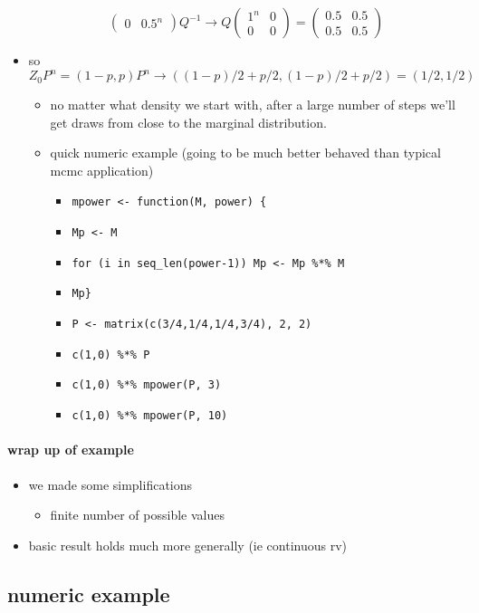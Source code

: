 \begin{itemize}
\[\begin{pmatrix}
    0 & 0.5^n \end{pmatrix} Q^{-1} \to Q \begin{pmatrix} 1^n & 0 \\ 0 &
    0 \end{pmatrix} = \begin{pmatrix} 0.5 & 0.5 \\ 0.5 &
    0.5 \end{pmatrix}\]
\item so $Z_0 P^n = (1-p, p) P^n \to ((1-p)/2 + p/2, (1-p)/2 + p/2) =
  (1/2, 1/2)$
\begin{itemize}
\item no matter what density we start with, after a large number
          of steps we'll get draws from close to the marginal
          distribution.
\item quick numeric example (going to be much better behaved than
          typical mcmc application)
\begin{itemize}
\item \texttt{mpower <- function(M, power) \{}
\item \texttt{Mp <- M}
\item \texttt{for (i in seq\_len(power-1)) Mp <- Mp \%*\% M}
\item \texttt{Mp\}}
\item \texttt{P <- matrix(c(3/4,1/4,1/4,3/4), 2, 2)}
\item \texttt{c(1,0) \%*\% P}
\item \texttt{c(1,0) \%*\% mpower(P, 3)}
\item \texttt{c(1,0) \%*\% mpower(P, 10)}
\end{itemize}
\end{itemize}
\end{itemize}

\paragraph{wrap up of example}
\begin{itemize}
\item we made some simplifications
\begin{itemize}
\item finite number of possible values
\end{itemize}
\item basic result holds much more generally (ie continuous rv)
\end{itemize}

\subsection{numeric example}

